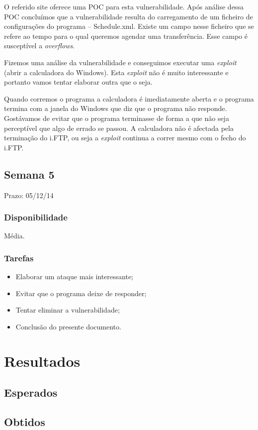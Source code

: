 \documentclass[a4paper]{article}
\begin{document}
O referido site oferece uma POC para esta vulnerabilidade. Após análise dessa POC concluímos que a vulnerabilidade resulta do carregamento de um ficheiro de configurações do programa -- Schedule.xml. Existe um campo nesse ficheiro que se refere ao tempo para o qual queremos agendar uma transferência. Esse campo é susceptível a \textit{overflows}.

Fizemos uma análise da vulnerabilidade e conseguimos executar uma \textit{exploit} (abrir a calculadora do Windows). Esta \textit{exploit} não é muito interessante e portanto vamos tentar elaborar outra que o seja.

Quando corremos o programa a calculadora é imediatamente aberta e o programa termina com a janela do Windows que diz que o programa não responde. Gostávamos de evitar que o programa terminasse de forma a que não seja perceptível que algo de errado se passou. A calculadora não é afectada pela terminação do i.FTP, ou seja a \textit{exploit} continua a correr mesmo com o fecho do i.FTP.


\subsection{Semana 5}
Prazo: 05/12/14
\subsubsection{Disponibilidade}
Média.
\subsubsection{Tarefas}
\begin{itemize}
	\item Elaborar um ataque mais interessante;
	\item Evitar que o programa deixe de responder;
	\item Tentar eliminar a vulnerabilidade;
	\item Conclusão do presente documento.
\end{itemize}


\pagebreak

\section{Resultados}

\subsection{Esperados}
\subsection{Obtidos}


\pagebreak

\nocite{CorelanTeam, refx86asm, genSEHexploits, AMD64vol3_2013}
\end{document}
